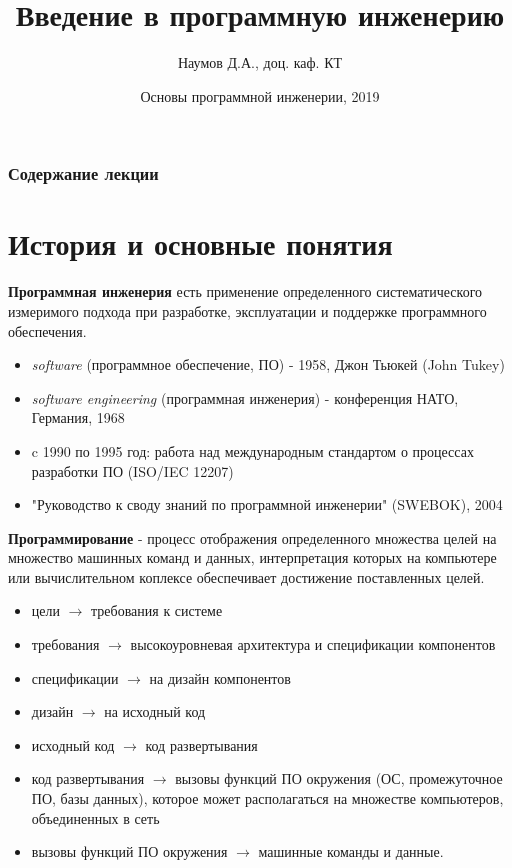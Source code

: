 \documentclass{beamer}
\title[Software Design]{Введение в программную инженерию}
\author{Наумов Д.А., доц. каф. КТ}
\date[11.02.2019] {Основы программной инженерии, 2019}
\begin{document}
\begin{frame}
  \titlepage
\end{frame}
  
\begin{frame}
  \frametitle{Содержание лекции}
  \tableofcontents  
\end{frame}
  
\section{История и основные понятия}

\begin{frame}[t]
\textbf{Программная инженерия} есть применение определенного систематического
измеримого подхода при разработке, эксплуатации и поддержке программного
обеспечения. 
\begin{itemize}
\item \textit{software} (программное обеспечение, ПО) - 1958, Джон Тьюкей (John Tukey)
\item \textit{software engineering} (программная инженерия) - конференция НАТО, Германия, 1968
\item c 1990 по 1995 год: работа над международным стандартом о процессах разработки ПО (ISO/IEC 12207)
\item  "Руководство к своду знаний по программной инженерии" (SWEBOK), 2004
\end{itemize}
\end{frame} 
   
\begin{frame}[t]
\textbf{Программирование} - процесс отображения определенного множества целей на
множество машинных команд и данных, интерпретация которых на компьютере
или вычислительном коплексе обеспечивает достижение поставленных целей. 
\begin{itemize}
\item цели $\rightarrow$ требования к системе
\item требования $\rightarrow$ высокоуровневая архитектура и спецификации компонентов
\item спецификации $\rightarrow$ на дизайн компонентов
\item дизайн $\rightarrow$ на исходный код 
\item исходный код $\rightarrow$ код развертывания
\item код развертывания $\rightarrow$ вызовы функций ПО окружения (ОС,
промежуточное ПО, базы данных), которое может располагаться на множестве
компьютеров, объединенных в сеть
\item вызовы функций ПО окружения $\rightarrow$ машинные команды и данные.
\end{itemize}
\end{frame} 
\end{document}
